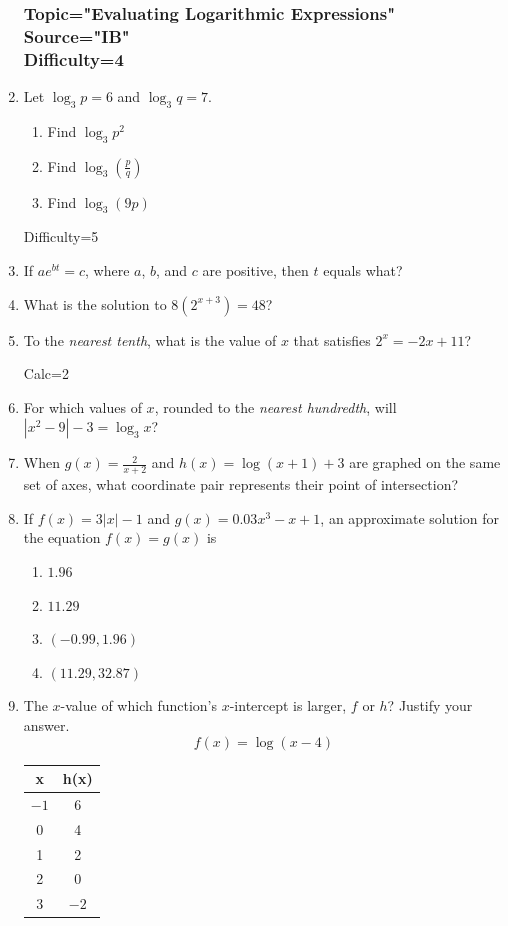 \documentclass[12pt, oneside]{article}
\begin{document}
\begin{enumerate}
\subsubsection*{Topic="Evaluating Logarithmic Expressions"\\
Source="IB"\\
Difficulty=4}


\item Let $\log_3 p = 6$ and $\log_3 q = 7$.
\begin{enumerate}
    \item Find $\log_3 {p^2}$
    \item Find $\displaystyle \log_3 {\left( \frac{p}{q} \right) }$
    \item Find $\log_3 {(9p)}$
\end{enumerate}

Difficulty=5
\item If $ae^{bt}=c$, where $a$, $b$, and $c$ are positive, then $t$ equals what? %

\item What is the solution to $8(2^{x+3})=48$? %

\item To the \emph{nearest tenth}, what is the value of $x$ that satisfies $2^x=-2x+11$? %

Calc=2
\item For which values of $x$, rounded to the \emph{nearest hundredth}, will $|x^2-9|-3= \log_3 x$?  %

\item When $\displaystyle g(x)= \frac{2}{x+2}$ and $h(x)=\log (x+1) +3$ are graphed on the same set of axes, what coordinate pair represents their point of intersection? %

\item If $f(x)=3|x| -1$ and $g(x)= 0.03x^3 -x +1$, an approximate solution for the equation $f(x)= g(x)$ is
\begin{enumerate}
    \item $1.96$
    \item $11.29$
    \item $(-0.99, 1.96)$
    \item $(11.29, 32.87)$
\end{enumerate}

\item The $x$-value of which function's $x$-intercept is larger, $f$ or $h$? Justify your answer. \[f(x)=\log (x-4) \]
\begin{tabular}{|c|c|}
\hline 
x & h(x)\\ 
\hline 
$-1$ & 6 \\ 
\hline 
0 & 4 \\ 
\hline 
1 & 2 \\ 
\hline 
2 & 0 \\ 
\hline 
3 & $-2$ \\ 
\hline 
\end{tabular} %


\end{enumerate}
\end{document}
